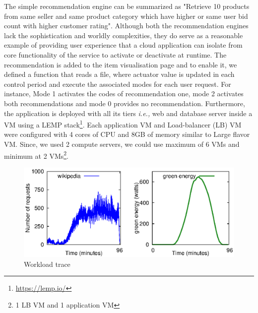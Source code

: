 The simple recommendation engine can be summarized as "Retrieve 10 products from same seller and same product category which have higher or same user bid count with higher customer rating". Although both the
recommendation engines lack the sophistication and worldly complexities, they do
serve as a reasonable example of providing user experience that a cloud
application can isolate from core functionality of the service 
to activate or
deactivate at runtime. The recommendation is added
to the item visualisation page and to enable it, we defined
a function that reads a file, where actuator value is updated
in each control period and execute the associated modes for
each user request. For instance, Mode 1 activates the codes of
recommendation one, mode 2 activates both recommendations
and mode 0 provides no recommendation. Furthermore, the application is deployed with all its tiers \emph{i.e.,} web and database server inside a VM using a LEMP stack\footnote{\url{https://lemp.io/}}. Each application VM and Load-balancer (LB) VM were configured with 4 cores of CPU and 8GB of memory similar to Large flavor VM. Since, we used 2 compute servers, we could use maximum of 6 VMs and minimum at 2 VMs\footnote{1 LB VM and 1 application VM}. 

\begin{figure}[h]
\includegraphics[scale=.65]{Graphs/workload_ucc.eps}
\caption{Workload trace}
\label{fig:workload} 
\end{figure}

